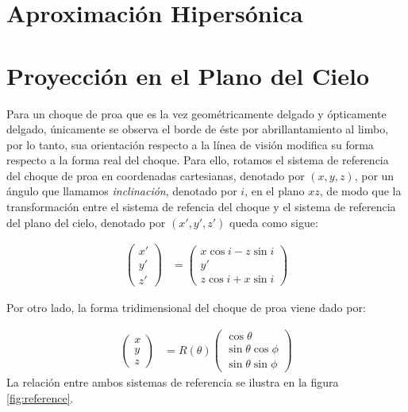 \section{Aproximación Hipersónica}
\label{sec:hipersonica}


\section{Proyección en el Plano del Cielo}

Para un choque de proa que es la vez geom\'etricamente delgado y
\'opticamente delgado, \'unicamente se observa el borde de \'este por
abrillantamiento al limbo, por lo tanto, sua orientaci\'on respecto a
la l\'inea de visi\'on modifica su forma respecto a la forma real del
choque. Para ello, rotamos el sistema de referencia del choque de proa
en coordenadas cartesianas, denotado por $(x, y, z)$, por un \'angulo
que llamamos \textit{inclinaci\'on}, denotado por $i$, en el plano $xz$,
de modo que la transformaci\'on entre el sistema de refencia del choque
y el sistema de referencia del plano del cielo, denotado por
$(x', y', z')$ queda como sigue:

\begin{align}
  \left(
  \begin{array}{c}
    x' \\ y' \\ z'
  \end{array}
  \right) &=
  \left(
  \begin{array}{c}
    x\cos i - z\sin i \\ y' \\ z\cos i + x\sin i
  \end{array}
  \right)
  \label{eq:rotation}
\end{align}

Por otro lado, la forma tridimensional del choque de proa viene dado por:

\begin{align}
  \left(
  \begin{array}{c}
    x \\ y \\ z
  \end{array}
  \right) &=
            R(\theta)\left(
            \begin{array}{c}
              \cos\theta \\
              \sin\theta\cos\phi \\
              \sin\theta\sin\phi
            \end{array}
            \right)
\end{align}
La relaci\'on entre ambos sistemas de referencia se ilustra en la figura
\ref{fig:reference}.

